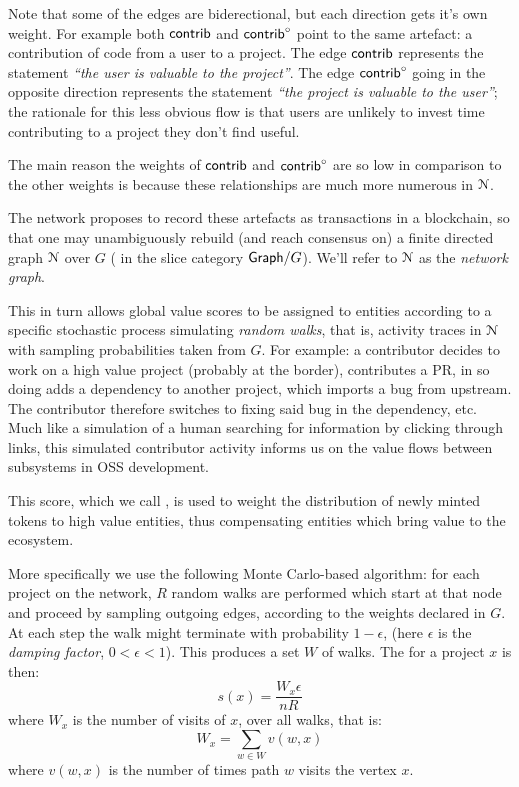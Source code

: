 Note that some of the edges are biderectional, but each direction gets
it's own weight. For example both $\mathsf{contrib}$ and $\mathsf{contrib}^\circ$ point to
the same artefact: a contribution of code from a user to a
project. The edge $\mathsf{contrib}$ represents the statement \emph{``the user
  is valuable to the project''}. The edge $\mathsf{contrib}^\circ$ going in the
opposite direction represents the statement \emph{``the project is
  valuable to the user''}; the rationale for this less obvious flow is
that users are unlikely to invest time contributing to a project they
don't find useful.

The main reason the weights of $\mathsf{contrib}$ and $\mathsf{contrib}^\circ$ are so low in comparison to the other weights is because these relationships are much more numerous in $\mathcal{N}$.


The \oscoin{} network proposes to record these artefacts as
transactions in a blockchain, so that one may unambiguously rebuild
(and reach consensus on) a finite directed graph $\mathcal{N}$ over $G$
(\ie{} in the slice category $\mathsf{Graph}/G$). We'll refer to $\mathcal{N}$
as the \emph{network graph}.

This in turn allows global value scores to be assigned to entities
according to a specific stochastic process simulating \emph{random
  walks}, that is, activity traces in $\mathcal{N}$ with sampling
probabilities taken from $G$. For example: a contributor decides to
work on a high value project (probably at the border), contributes a
PR, in so doing adds a dependency to another project, which imports a
bug from upstream. The contributor therefore switches to fixing said
bug in the dependency, etc. Much like a simulation of a human
searching for information by clicking through links, this simulated
contributor activity informs us on the value flows between subsystems
in OSS development.

This score, which we call \osrank{}, is used to weight the
distribution of newly minted tokens to high value entities, thus
compensating entities which bring value to the ecosystem.

More specifically we use the following Monte Carlo-based algorithm:
for each project on the network, $R$ random walks are performed which
start at that node and proceed by sampling outgoing edges, according
to the weights declared in $G$. At each step the walk might terminate
with probability $1 - \epsilon$, (here $\epsilon$ is the \emph{damping
  factor}, $0 < \epsilon < 1$). This produces a set $W$ of walks. The
\osrank{} for a project $x$ is then:
\[
  s(x) = \frac{W_x \epsilon}{n R}
\]
where $W_x$ is the number of visits of $x$, over all walks, that is:
\[
W_x = \sum_{w \in W} v(w,x)
\]
where $v(w,x)$ is the number of times path $w$ visits the vertex $x$.

